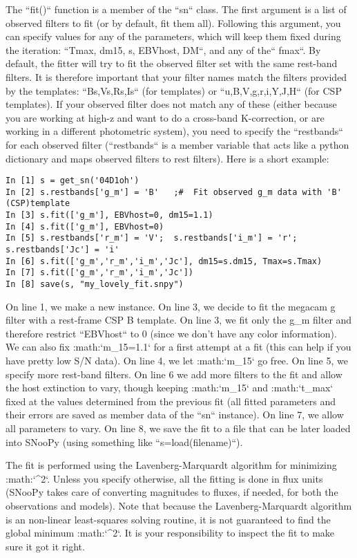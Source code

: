The ``fit()`` function is a member of the ``sn`` class.
The first argument is a list of observed filters to fit (or by default,
fit them all). Following this argument, you can specify values for
any of the parameters, which will keep them fixed during the iteration:
``Tmax, dm15, s, EBVhost, DM``, and any of the`` fmax``.
By default, the fitter will try to fit the observed filter set with
the same rest-band filters. It is therefore important that your filter
names match the filters provided by the templates: ``Bs,Vs,Rs,Is``
(for \citet{2006ApJ...647..501P} templates) or ``u,B,V,g,r,i,Y,J,H``
(for CSP templates). If your observed filter does not match any of
these (either because you are working at high-z and want to do a cross-band
K-correction, or are working in a different photometric system), you
need to specify the ``restbands`` for each observed filter (``restbands``
is a member variable that acts like a python dictionary and maps observed
filters to rest filters). Here is a short example:

\begin{verbatim}
In [1] s = get_sn('04D1oh')
In [2] s.restbands['g_m'] = 'B'   ;#  Fit observed g_m data with 'B' (CSP)template
In [3] s.fit(['g_m'], EBVhost=0, dm15=1.1)
In [4] s.fit(['g_m'], EBVhost=0)
In [5] s.restbands['r_m'] = 'V';  s.restbands['i_m'] = 'r';  s.restbands['Jc'] = 'i'
In [6] s.fit(['g_m','r_m','i_m','Jc'], dm15=s.dm15, Tmax=s.Tmax)
In [7] s.fit(['g_m','r_m','i_m','Jc'])
In [8] save(s, "my_lovely_fit.snpy")
\end{verbatim}

On line 1, we make a new instance. On line 3, we decide to fit the
megacam g filter with a rest-frame CSP B template. On line 3, we fit
only the g_m filter and therefore restrict ``EBVhost`` to 0
(since we don't have any color information). We can also fix :math:`\Delta m_{15}=1.1`
for a first attempt at a fit (this can help if you have pretty low
S/N data). On line 4, we let :math:`\Delta m_{15}` go free. On line 5,
we specify more rest-band filters. On line 6 we add more filters to
the fit and allow the host extinction to vary, though keeping :math:`\Delta m_{15}`
and :math:`t_{max}` fixed at the values determined from the previous fit
(all fitted parameters and their errors are saved as member data of
the ``sn`` instance). On line 7, we allow all parameters to vary.
On line 8, we save the fit to a file that can be later loaded into
SNooPy (using something like ``s=load(filename)``).

The fit is performed using the Lavenberg-Marquardt algorithm for minimizing
:math:`\chi^{2}`. Unless you specify otherwise, all the fitting is done
in flux units (SNooPy takes care of converting magnitudes to fluxes,
if needed, for both the observations and models). Note that because
the Lavenberg-Marquardt algorithm is an non-linear least-squares solving
routine, it is not guaranteed to find the global minimum :math:`\chi^{2}`.
It is your responsibility to inspect the fit to make sure it got it
right.

